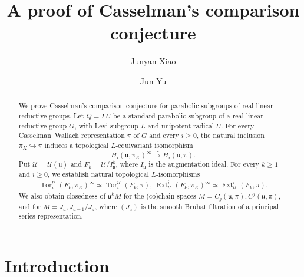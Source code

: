 \documentclass[a4paper,12pt]{amsart}
\numberwithin{equation}{section}
\theoremstyle{plain}
\theoremstyle{definition}
\theoremstyle{remark}
\begin{document}
\title[Casselman's comparison conjecture]{A proof of Casselman's comparison conjecture}

\author{Junyan Xiao}
\address{(Xiao)School of Mathematical Sciences, Peking University, No. 5 Yiheyuan Road, Beijing 100871, P.R. China}

\author{Jun Yu}
\address{(Yu)Jun Yu, School of Mathematical Sciences and Beijing International Center for Mathematical Research, Peking University, No. 5 Yiheyuan Road, Beijing 100871, China}


\begin{abstract}
We prove Casselman's comparison conjecture for parabolic subgroups of real linear reductive groups.
Let $Q=LU$ be a standard parabolic subgroup of a real linear reductive group $G$, with Levi subgroup $L$ and unipotent radical $U$.
For every Casselman--Wallach representation $\pi$ of $G$ and every $i\geq0$, the natural inclusion $\pi_K\hookrightarrow\pi$ induces a topological $L$-equivariant isomorphism
\[
 H_i(\mathfrak u,\pi_K)^\infty\xrightarrow{\ \sim\ }
 H_i(\mathfrak u,\pi).
\]
Put $\mathscr U=\mathcal U(\mathfrak u)$ and $F_k=\mathscr U/I_{\mathfrak u}^k$, where $I_{\mathfrak u}$ is the augmentation ideal.
For every $k\geq1$ and $i\geq0$, we establish natural topological $L$-isomorphisms
\[
\begin{aligned}
 \operatorname{Tor}_i^{\mathscr U}(F_k,\pi_K)^\infty
 \simeq \operatorname{Tor}_i^{\mathscr U}(F_k,\pi),\ 
 \operatorname{Ext}^i_{\mathscr U}(F_k,\pi_K)^\infty
 \simeq \operatorname{Ext}^i_{\mathscr U}(F_k,\pi).
\end{aligned}
\]
We also obtain closedness of $\mathfrak u^kM$
for the (co)chain spaces $M=C_j(\mathfrak u,\pi),C^j(\mathfrak u,\pi)$, and for $M=J_a,J_{a-1}/J_a$, where $(J_a)$ is the smooth Bruhat filtration of a principal series representation.
\end{abstract}
\maketitle
\setcounter{tocdepth}{2}
\begingroup
\small
\tableofcontents
\endgroup
\newpage

\section{Introduction}\label{S:introduction}
\end{document}
